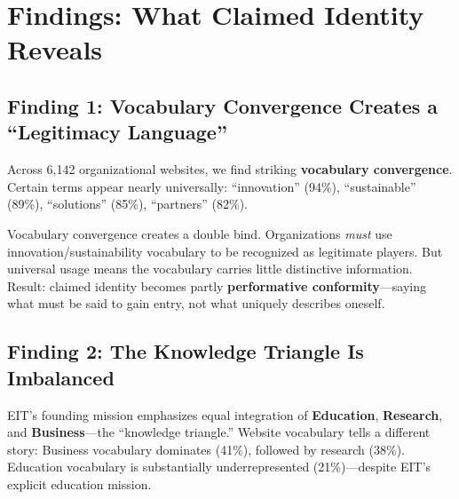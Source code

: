 \documentclass[../main.tex]{subfiles}
\begin{document}


\section*{Findings: What Claimed Identity Reveals}

\subsection*{Finding 1: Vocabulary Convergence Creates a ``Legitimacy Language''}

Across 6,142 organizational websites, we find striking \textbf{vocabulary convergence}. Certain terms appear nearly universally: ``innovation'' (94\%), ``sustainable'' (89\%), ``solutions'' (85\%), ``partners'' (82\%).

\begin{insightbox}
Vocabulary convergence creates a double bind. Organizations \emph{must} use innovation/sustainability vocabulary to be recognized as legitimate players. But universal usage means the vocabulary carries little distinctive information. Result: claimed identity becomes partly \textbf{performative conformity}---saying what must be said to gain entry, not what uniquely describes oneself.
\end{insightbox}

\subsection*{Finding 2: The Knowledge Triangle Is Imbalanced}

EIT's founding mission emphasizes equal integration of \textbf{Education}, \textbf{Research}, and \textbf{Business}---the ``knowledge triangle.'' Website vocabulary tells a different story: Business vocabulary dominates (41\%), followed by research (38\%). Education vocabulary is substantially underrepresented (21\%)---despite EIT's explicit education mission.

\end{document}
